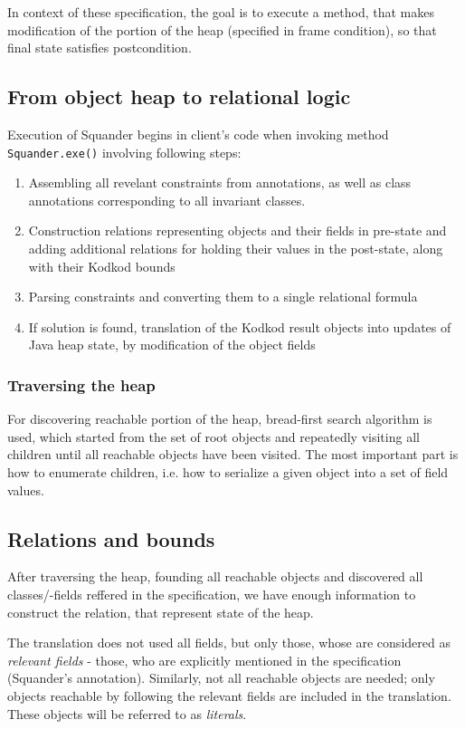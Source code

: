 \documentclass[11pt,twoside,a4paper]{book}
\begin{document}
In context of these specification, the goal is to execute a method, that makes
modification of the portion of the heap (specified in frame condition), so that
final state satisfies postcondition.

\subsection{From object heap to relational logic}

Execution of Squander begins in client's code when invoking
method \verb|Squander.exe()| involving following steps:

\begin{enumerate}
  \item Assembling all revelant constraints from annotations, as well as class
  annotations corresponding to all invariant classes.
  \item Construction relations representing objects and their fields in
  pre-state and adding additional relations for holding their values in the
  post-state, along with their Kodkod bounds
  \item Parsing constraints and converting them to a single relational formula
  \item If solution is found, translation of the Kodkod result objects into
  updates of Java heap state, by modification of the object fields
\end{enumerate}

\subsubsection{Traversing the heap}

For discovering reachable portion of the heap, bread-first search algorithm is
used, which started from the set of root objects and repeatedly visiting all
children until all reachable objects have been visited. The most important part
is how to enumerate children, i.e. how to serialize a given object into a set of
field values.

\subsection{Relations and bounds}
After traversing the heap, founding all reachable objects and
discovered all classes/-fields reffered in the specification, we have enough
information to construct the relation, that represent state of the heap.

The translation does not used all fields, but only those, whose are considered
as \textit{relevant fields} - those, who are explicitly mentioned in the
specification (Squander's annotation). Similarly, not all reachable objects are
needed; only objects reachable by following the relevant fields are included in
the translation. These objects will be referred to as \textit{literals}.
\end{document}
